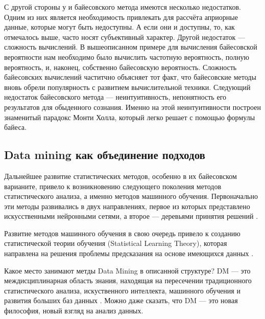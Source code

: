 С другой стороны у и байесовского метода имеются несколько недостатков. Одним из них является необходимость привлекать для рассчёта априорные данные, которые могут быть недоступны. А если они и доступны, то, как отмечалось выше, часто носят субъективный характер. Другой недостаток --- сложность вычислений. В вышеописанном примере для вычисления байесовской вероятности нам необходимо было вычислить частотную вероятность, полную вероятность, и, наконец, собственно байесовскую вероятность. Сложность байесовских вычислений частитчно объясняет тот факт, что байесовские методы вновь обрели популярность с развитием вычислительной техники. Следующий недостаток байесовского метода --- неинтуитивность, непонятность его результатов для обыденного сознания. Именно на этой неинтуитивности построен знаменитый парадокс Монти Холла, который легко решает с помощью формулы байеса.

\subsection{Data mining как объединение подходов}

Дальнейшее развитие статистических методов, особенно в их байесовском варианите, привело к возникновению следующего поколения методов статистического анализа, а именно методов машинного обучения. Первоначально эти методы развивались в двух направлениях, первое из которых представлено искусственными нейронными сетями, а второе --- деревьями принятия решений \cite[стр. 11-12]{handbook_stat_dm}.

Развитие методов машинного обучения в свою очередь привело к созданию статистической теории обучения (Statistical Learning Theory), которая направлена на решения проблемы предсказания на основе имеющихся данных \cite[стр. 12-13]{handbook_stat_dm}.

Какое место занимают метды Data Mining в описанной структуре? DM --- это междисциплинарная область знания, находящая на пересечении традиционного статистического анализа, искуственного интеллекта, машинного обучения и развития больших баз данных \cite[стр. 5]{handbook_stat_dm}. Можно даже сказать, что DM --- это новая философия, новый взгляд на анализ данных. 

